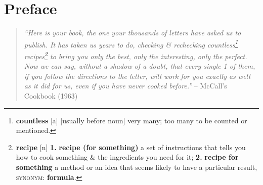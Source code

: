 \documentclass[oneside]{book}
\numberwithin{equation}{section}
\begin{document}
\section*{Preface}
\begin{quotation}
	\textit{``Here is your book, the one your thousands of letters have asked us to publish. It has taken us years to do, checking \& rechecking countless\footnote{\textbf{countless} [a] [usually before noun] very many; too many to be counted or mentioned.} recipes\footnote{\textbf{recipe} [n] \textbf{1.} \textbf{recipe (for something)} a set of instructions that tells you how to cook something \& the ingredients you need for it; \textbf{2.} \textbf{recipe for something} a method or an idea that seems likely to have a particular result, \textsc{synonym}: \textbf{formula}.} to bring you only the best, only the interesting, only the perfect. Now we can say, without a shadow of a doubt, that every single 1 of them, if you follow the directions to the letter, will work for you exactly as well as it did for us, even if you have never cooked before.''} -- McCall's Cookbook (1963)
\end{quotation}
\end{document}
